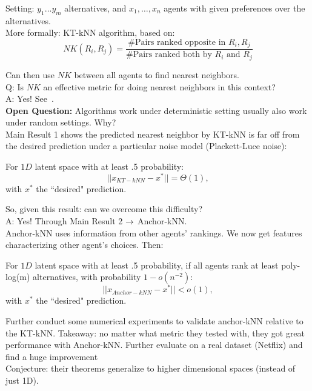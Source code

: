 Setting: $y_1 \ldots y_m$ alternatives, and $x_1, \ldots, x_n$ agents with given preferences over the alternatives. \\

More formally: KT-kNN algorithm, based on:
\[
NK(R_i, R_j) =\frac{\text{\# Pairs ranked opposite in $R_i, R_j$}}{\text{\# Pairs ranked both by $R_i$ and $R_j$}}
\]

Can then use $NK$ between all agents to find nearest neighbors. \\

Q: Is $NK$ an effective metric for doing nearest neighbors in this context? \\

A: Yes! See~\citet{katz2017nonparametric}.\\

{\bf Open Question:} Algorithms work under deterministic setting usually also work under random settings. Why? \\

Main Result 1 shows the predicted nearest neighbor by KT-kNN is far off from the desired prediction under a particular noise model (Plackett-Luce noise):
\begin{theorem}
For $1D$ latent space with at least .5 probability:
\[
||x_{KT-kNN} - x^*|| = \Theta(1),
\]
with $x^*$ the ``desired" prediction.
\end{theorem}

So, given this result: can we overcome this difficulty? \\

A: Yes! Through Main Result 2 $\rightarrow$ Anchor-kNN. \\

Anchor-kNN uses information from other agents' rankings. We now get features characterizing other agent's choices. Then:
\begin{theorem}
For $1D$ latent space with at least .5 probability, if all agents rank at least poly-log(m) alternatives, with probability $1-o(n^{-2})$:
\[
||x_{Anchor-kNN} - x^*|| < o(1),
\]
with $x^*$ the ``desired" prediction.
\end{theorem}

Further conduct some numerical experiments to validate anchor-kNN relative to the KT-kNN. Takeaway: no matter what metric they tested with, they got great performance with Anchor-kNN. Further evaluate on a real dataset (Netflix) and find a huge improvement \\

Conjecture: their theorems generalize to higher dimensional spaces (instead of just 1D).

